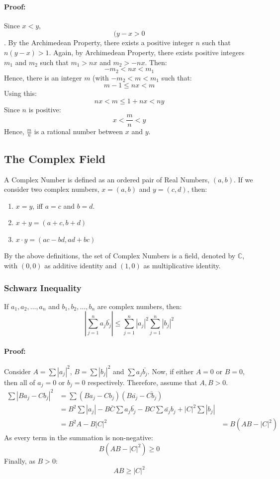 \documentclass[12pt, oneside]{book}
\theoremstyle{definition}
\begin{document}
\paragraph{Proof:} Since \(x<y\), \[(y-x > 0\].
By the Archimedean Property, there exists a positive integer \(n\) such that \(n(y-x) > 1\).
Again, by Archimedean Property, there exists positive integers \(m_1\) and \(m_2\) such that \(m_1 > nx\) and \(m_2 > -nx\).
Then: \[ -m_2 < nx < m_1 \]
Hence, there is an integer \(m\) (with \( -m_2 < m < m_1 \) such that:
\[ m-1 \leq nx < m \]
Using this:
\[ nx < m \leq 1+nx <ny \]
Since \(n\) is positive:
\[ x < \frac{m}{n} < y \]
Hence, \(\frac{m}{n}\) is a rational number between \(x\) and \(y\).

\subsection{The Complex Field}
A Complex Number is defined as an ordered pair of Real Numbers, \((a,b)\).
If we consider two complex numbers, \(x=(a,b)\) and \(y=(c,d)\), then:
\begin{enumerate}
	\item \(x = y\), iff \(a=c\) and \(b=d\).
	\item \(x+y = (a+c,b+d)\)
	\item \(x \cdot y = (ac-bd,ad+bc)\)
\end{enumerate}
By the above definitions, the set of Complex Numbers is a field, denoted by \(\mathbb{C}\), with \((0,0)\) as additive identity and \((1,0)\) as multiplicative identity.

\subsubsection{Schwarz Inequality}
If \( a_1, a_2, \dots, a_n \) and \( b_1, b_2, \dots, b_n \) are complex numbers, then:
\[ \left| \sum_{j=1}^{n} a_j \bar{b_j} \right| \leq \sum_{j=1}^{n} \left|a_j\right|^2 \sum_{j=1}^{n} \left|b_j\right|^2 \]

\paragraph{Proof:} Consider \(A = \sum |a_j|^2 \), \(B = \sum |b_j|^2\) and \(\sum a_j \bar{b_j}\).
Now, if either \(A=0\) or \(B=0\), then all of \(a_j=0\) or \(b_j=0\) respectively.
Therefore, assume that \(A,B>0\).
\begin{align*}
	\sum \left| Ba_j - Cb_j \right|^2 & = \sum \left( Ba_j - Cb_j \right)\left( B \bar{a_j} - \bar{Cb_j} \right)                                                   \\
	                                  & = B^2 \sum \left|a_j\right| - B\bar{C} \sum a_j \bar{b_j} - BC \sum \bar{a_j} b_j + \left|C\right|^2 \sum \left|b_j\right| \\
	                                  & = B^2 A - B\left|C\right|^2
	                                  & = B\left(AB - \left|C\right|^2\right)
\end{align*}
As every term in the summation is non-negative:
\[B\left(AB - |C|^2\right) \geq 0\]
Finally, as \(B>0\):
\[ AB \geq |C|^2\]
\end{document}
